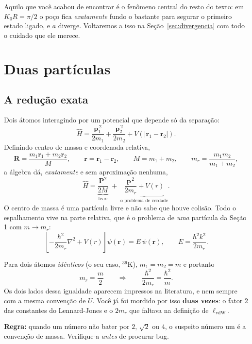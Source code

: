\documentclass[11pt,a4paper]{article}
\newcommand{\hbtm}{\frac{\hbar^{2}}{2m_{r}}}
\renewcommand{\vec}[1]{\mathbf{#1}}
\begin{document}
Aquilo que você acabou de encontrar é o fenômeno central do resto do texto: em
$K_{0}R=\pi/2$ o poço fica \emph{exatamente} fundo o bastante para segurar o primeiro
estado ligado, e $a$ diverge. Voltaremos a isso na Seção~\ref{sec:divergencia} com
todo o cuidado que ele merece.

\section{Duas partículas}

\subsection{A redução exata}

Dois átomos interagindo por um potencial que depende só da separação:
\begin{equation}
\hat H = \frac{\vec p_{1}^{\,2}}{2m_{1}} + \frac{\vec p_{2}^{\,2}}{2m_{2}} + V(|\vec r_{1}-\vec r_{2}|).
\end{equation}
Definindo centro de massa e coordenada relativa,
\begin{equation}
\vec R = \frac{m_{1}\vec r_{1}+m_{2}\vec r_{2}}{M},\qquad
\vec r = \vec r_{1}-\vec r_{2},\qquad
M=m_{1}+m_{2},\qquad
m_{r}=\frac{m_{1}m_{2}}{m_{1}+m_{2}},
\end{equation}
a álgebra dá, \emph{exatamente} e sem aproximação nenhuma,
\begin{equation}
\hat H = \underbrace{\frac{\vec P^{2}}{2M}}_{\text{livre}} \;+\; \underbrace{\frac{\vec p^{\,2}}{2m_{r}} + V(r)}_{\text{o problema de verdade}}.
\end{equation}
O centro de massa é uma partícula livre e não sabe que houve colisão. Todo o
espalhamento vive na parte relativa, que é o problema de \emph{uma} partícula da
Seção 1 com $m\to m_{r}$:
\begin{equation}
\left[-\hbtm\nabla^{2}+V(r)\right]\psi(\vec r)=E\,\psi(\vec r),
\qquad E=\frac{\hbar^{2}k^{2}}{2m_{r}}.
\end{equation}

\begin{atencao}
Para dois átomos \emph{idênticos} (o seu caso, $^{39}$K), $m_{1}=m_{2}=m$ e portanto
\[
m_{r}=\frac{m}{2}
\qquad\Longrightarrow\qquad
\hbtm=\frac{\hbar^{2}}{m}.
\]
Os dois lados dessa igualdade aparecem impressos na literatura, e nem sempre com a
mesma convenção de $U$. Você já foi mordido por isso \textbf{duas vezes}: o fator 2
das constantes do Lennard-Jones e o $2m_{r}$ que faltava na definição de
$\ell_{\mathrm{vdW}}$.

\textbf{Regra:} quando um número não bater por $2$, $\sqrt{2}$ ou $4$, o suspeito
número um é a convenção de massa. Verifique-a \emph{antes} de procurar bug.
\end{atencao}
\end{document}
